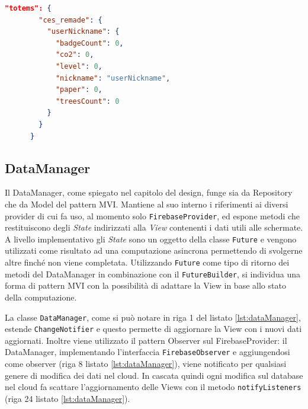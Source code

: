 \begin{lstlisting}[language=json, caption={Esempio di oggetto JSON che memorizza i dati utente per ciascun Totem}, label={lst:userDataTotem}]
      "totems": {
        "ces_remade": {
          "userNickname": {
            "badgeCount": 0,
            "co2": 0,
            "level": 0,
            "nickname": "userNickname",
            "paper": 0,
            "treesCount": 0
          }
        }
      }
\end{lstlisting}

\subsection{DataManager}
Il DataManager, come spiegato nel capitolo del design, funge sia da Repository che da Model del pattern MVI. Mantiene al suo interno i riferimenti ai diversi provider di cui fa uso, al momento solo \texttt{FirebaseProvider}, ed espone metodi che restituiscono degli \textit{State} indirizzati alla \textit{View} contenenti i dati utili alle schermate. A livello implementativo gli \textit{State} sono un oggetto della classe \texttt{Future} e vengono utilizzati come risultato ad una computazione asincrona permettendo di svolgerne altre finché non viene completata. Utilizzando \texttt{Future} come tipo di ritorno dei metodi del DataManager in combinazione con il \texttt{FutureBuilder}, si individua una forma di pattern MVI con la possibilità di adattare la View in base allo stato della computazione.

La classe \texttt{DataManager}, come si può notare in riga 1 del listato \ref{lst:dataManager}, estende \texttt{ChangeNotifier} e questo permette di aggiornare la View con i nuovi dati aggiornati.
Inoltre viene utilizzato il pattern Observer sul FirebaseProvider: il DataManager, implementando l'interfaccia \texttt{FirebaseObserver} e aggiungendosi come observer (riga 8 listato \ref{lst:dataManager}), viene notificato per qualsiasi genere di modifica dei dati nel cloud.
In cascata quindi ogni modifica sul database nel cloud fa scattare l'aggiornamento delle Views con il metodo \texttt{notifyListeners} (riga 24 listato \ref{lst:dataManager}).

